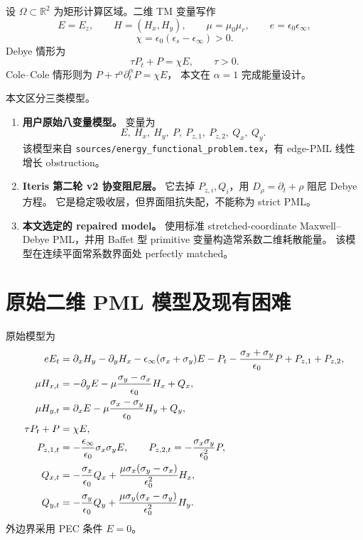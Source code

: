 \documentclass[UTF8,a4paper,11pt]{ctexart}
\newcommand{\Om}{\Omega}
\newcommand{\sx}{\sigma_x}
\newcommand{\sy}{\sigma_y}
\newcommand{\R}{\mathbb R}
\begin{document}
设 \(\Om\subset\R^2\) 为矩形计算区域。二维 TM 变量写作
\[
E=E_z,\qquad H=(H_x,H_y),\qquad
\mu=\mu_0\mu_r,\qquad e=\epsilon_0\epsilon_\infty,
\]
\[
\chi=\epsilon_0(\epsilon_s-\epsilon_\infty)>0.
\]
Debye 情形为
\[
\tau P_t+P=\chi E,\qquad \tau>0.
\]
Cole--Cole 情形则为 \(P+\tau^\alpha\partial_t^\alpha P=\chi E\)，
本文在 \(\alpha=1\) 完成能量设计。

本文区分三类模型。

\begin{enumerate}
\item \textbf{用户原始八变量模型。} 变量为
\[
E,\ H_x,\ H_y,\ P,\ P_{z,1},\ P_{z,2},\ Q_x,\ Q_y .
\]
该模型来自 \texttt{sources/energy\_functional\_problem.tex}，有
edge-PML 线性增长 obstruction。
\item \textbf{Iteris 第二轮 v2 协变阻尼层。} 它去掉
\(P_{z,i},Q_i\)，用 \(D_\rho=\partial_t+\rho\) 阻尼 Debye 方程。
它是稳定吸收层，但界面阻抗失配，不能称为 strict PML。
\item \textbf{本文选定的 repaired model。} 使用标准 stretched-coordinate
Maxwell--Debye PML，并用 Baffet 型 primitive 变量构造常系数二维耗散能量。
该模型在连续平面常系数界面处 perfectly matched。
\end{enumerate}

\section{原始二维 PML 模型及现有困难}

原始模型为
\begin{align}
eE_t
&=\partial_xH_y-\partial_yH_x
-\epsilon_\infty(\sx+\sy)E-P_t-\frac{\sx+\sy}{\epsilon_0}P
+P_{z,1}+P_{z,2}, \notag\\
\mu H_{x,t}
&=-\partial_yE-\mu\frac{\sy-\sx}{\epsilon_0}H_x+Q_x,\notag\\
\mu H_{y,t}
&=\partial_xE-\mu\frac{\sx-\sy}{\epsilon_0}H_y+Q_y,\notag\\
\tau P_t+P&=\chi E,\notag\\
P_{z,1,t}&=-\frac{\epsilon_\infty}{\epsilon_0}\sx\sy E,\qquad
P_{z,2,t}=-\frac{\sx\sy}{\epsilon_0^2}P,\notag\\
Q_{x,t}&=-\frac{\sx}{\epsilon_0}Q_x
+\frac{\mu\sx(\sy-\sx)}{\epsilon_0^2}H_x,\notag\\
Q_{y,t}&=-\frac{\sy}{\epsilon_0}Q_y
+\frac{\mu\sy(\sx-\sy)}{\epsilon_0^2}H_y .
\label{eq:old-model}
\end{align}
外边界采用 PEC 条件 \(E=0\)。
\end{document}

